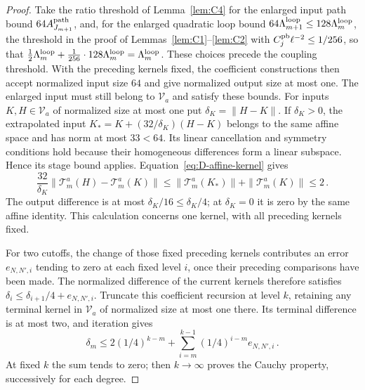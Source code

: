 \begin{proof}
Take the ratio threshold of Lemma~\ref{lem:C4} for the enlarged input path bound $64A_{J_{m+1}}^{\rm path}$, and, for the enlarged quadratic loop bound $64\Lambda_{m+1}^{\rm loop}\le128\Lambda_m^{\rm loop}$, the threshold in the proof of Lemmas~\ref{lem:C1}--\ref{lem:C2} with $C_j^{\rm pb}\ell^{-2}\le1/256$, so that $\tfrac12\Lambda_m^{\rm loop}+\tfrac1{256}\cdot128\Lambda_m^{\rm loop}=\Lambda_m^{\rm loop}$. These choices precede the coupling threshold. With the preceding kernels fixed, the coefficient constructions then accept normalized input size $64$ and give normalized output size at most one. The enlarged input must still belong to $\mathcal V_a$ and satisfy these bounds. For inputs $K,H\in\mathcal V_a$ of normalized size at most one put $\delta_K=\|H-K\|$. If $\delta_K>0$, the extrapolated input $K_* =K+(32/\delta_K)(H-K)$ belongs to the same affine space and has norm at most $33<64$. Its linear cancellation and symmetry conditions hold because their homogeneous differences form a linear subspace. Hence its stage bound applies. Equation~\eqref{eq:D-affine-kernel} gives
\begin{equation*}
\frac{32}{\delta_K}\|\mathcal T_m^a(H)-\mathcal T_m^a(K)\|
\le\|\mathcal T_m^a(K_*)\|+\|\mathcal T_m^a(K)\|\le2\,.
\end{equation*}
The output difference is at most $\delta_K/16\le\delta_K/4$; at $\delta_K=0$ it is zero by the same affine identity. This calculation concerns one kernel, with all preceding kernels fixed.

For two cutoffs, the change of those fixed preceding kernels contributes an error $e_{N,N',i}$ tending to zero at each fixed level $i$, once their preceding comparisons have been made. The normalized difference of the current kernels therefore satisfies $\delta_i\le\delta_{i+1}/4+e_{N,N',i}$. Truncate this coefficient recursion at level $k$, retaining any terminal kernel in $\mathcal V_a$ of normalized size at most one there. Its terminal difference is at most two, and iteration gives
\begin{equation*}
\delta_m\le2(1/4)^{k-m}
+\sum_{i=m}^{k-1}(1/4)^{i-m}e_{N,N',i}\,.
\end{equation*}
At fixed $k$ the sum tends to zero; then $k\to\infty$ proves the Cauchy property, successively for each degree.


\end{proof}
